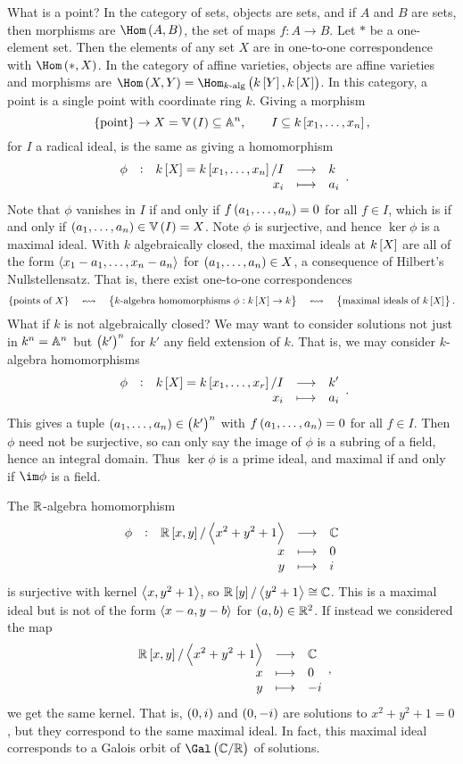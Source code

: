 What is a point? In the category of sets, objects are sets, and if $ A $ and $ B $ are sets, then morphisms are $ \Hom\br{A, B} $, the set of maps $ f : A \to B $. Let $ * $ be a one-element set. Then the elements of any set $ X $ are in one-to-one correspondence with $ \Hom\br{*, X} $. In the category of affine varieties, objects are affine varieties and morphisms are $ \Hom\br{X, Y} = \Hom_{\text{$ k $-alg}}\br{k\sbr{Y}, k\sbr{X}} $. In this category, a point is a single point with coordinate ring $ k $. Giving a morphism
$$ \cbr{\text{point}} \to X = \VV\br{I} \subseteq \AA^n, \qquad I \subseteq k\sbr{x_1, \dots, x_n}, $$
for $ I $ a radical ideal, is the same as giving a homomorphism
$$ \function[\phi]{k\sbr{X} = k\sbr{x_1, \dots, x_n} / I}{k}{x_i}{a_i}. $$
Note that $ \phi $ vanishes in $ I $ if and only if $ f\br{a_1, \dots, a_n} = 0 $ for all $ f \in I $, which is if and only if $ \br{a_1, \dots, a_n} \in \VV\br{I} = X $. Note $ \phi $ is surjective, and hence $ \ker \phi $ is a maximal ideal. With $ k $ algebraically closed, the maximal ideals at $ k\sbr{X} $ are all of the form $ \abr{x_1 - a_1, \dots, x_n - a_n} $ for $ \br{a_1, \dots, a_n} \in X $, a consequence of Hilbert's Nullstellensatz. That is, there exist one-to-one correspondences
$$ \cbr{\text{points of} \ X} \quad \leftrightsquigarrow \quad \cbr{\text{$ k $-algebra homomorphisms} \ \phi : k\sbr{X} \to k} \quad \leftrightsquigarrow \quad \cbr{\text{maximal ideals of} \ k\sbr{X}}. $$
What if $ k $ is not algebraically closed? We may want to consider solutions not just in $ k^n = \AA^n $ but $ \br{k'}^n $ for $ k' $ any field extension of $ k $. That is, we may consider $ k $-algebra homomorphisms
$$ \function[\phi]{k\sbr{X} = k\sbr{x_1, \dots, x_r} / I}{k'}{x_i}{a_i}. $$
This gives a tuple $ \br{a_1, \dots, a_n} \in \br{k'}^n $ with $ f\br{a_1, \dots, a_n} = 0 $ for all $ f \in I $. Then $ \phi $ need not be surjective, so can only say the image of $ \phi $ is a subring of a field, hence an integral domain. Thus $ \ker \phi $ is a prime ideal, and maximal if and only if $ \im \phi $ is a field.

\begin{example*}
The $ \RR $-algebra homomorphism
$$ \functions[\phi]{\RR\sbr{x, y} / \abr{x^2 + y^2 + 1}}{\CC}{x}{0}{y}{i} $$
is surjective with kernel $ \abr{x, y^2 + 1} $, so $ \RR\sbr{y} / \abr{y^2 + 1} \cong \CC $. This is a maximal ideal but is not of the form $ \abr{x - a, y - b} $ for $ \br{a, b} \in \RR^2 $. If instead we considered the map
$$ \functions{\RR\sbr{x, y} / \abr{x^2 + y^2 + 1}}{\CC}{x}{0}{y}{-i}, $$
we get the same kernel. That is, $ \br{0, i} $ and $ \br{0, -i} $ are solutions to $ x^2 + y^2 + 1 = 0 $, but they correspond to the same maximal ideal. In fact, this maximal ideal corresponds to a Galois orbit of $ \Gal\br{\CC / \RR} $ of solutions.
\end{example*}

